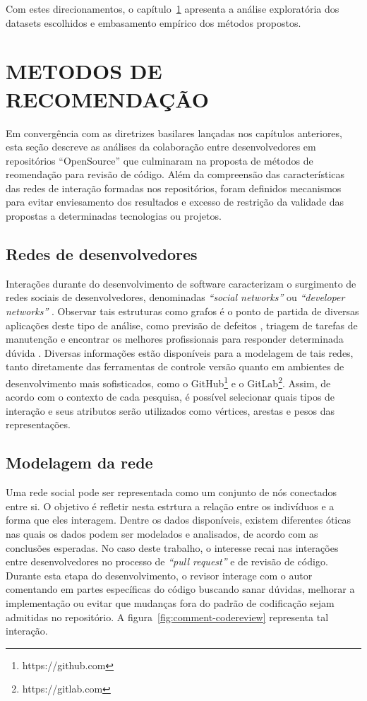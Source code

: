 \documentclass[12pt,openany,oneside,a4paper,english,brazil]{abntbibufjf}
\begin{document}
Com estes direcionamentos, o capítulo~\ref{chap:metodos} apresenta a análise exploratória dos datasets escolhidos e embasamento empírico dos métodos propostos.

\chapter{METODOS DE RECOMENDAÇÃO}\label{chap:metodos}

Em convergência com as diretrizes basilares lançadas nos capítulos anteriores, esta seção descreve as análises da colaboração entre desenvolvedores em repositórios ``OpenSource'' que culminaram na proposta de métodos de reomendação para revisão de código. Além da compreensão das características das redes de interação formadas nos repositórios, foram definidos mecanismos para evitar enviesamento dos resultados e excesso de restrição da validade das propostas a determinadas tecnologias ou projetos.

\section{Redes de desenvolvedores}

Interações durante do desenvolvimento de software caracterizam o surgimento de redes sociais de desenvolvedores, denominadas \textit{``social networks''} ou \textit{``developer networks''} \cite{lopez2004}. Observar tais estruturas como grafos é o ponto de partida de diversas aplicações deste tipo de análise, como previsão de defeitos \cite{meneely2008}, triagem de tarefas de manutenção \cite{zhang2012} e encontrar os melhores profissionais para responder determinada dúvida \cite{li2010}. Diversas informações estão disponíveis para a modelagem de tais redes, tanto diretamente das ferramentas de controle versão quanto em ambientes de desenvolvimento mais sofisticados, como o GitHub\footnote{https://github.com} e o GitLab\footnote{https://gitlab.com}. Assim, de acordo com o contexto de cada pesquisa, é possível selecionar quais tipos de interação e seus atributos serão utilizados como vértices, arestas e pesos das representações.

\section{Modelagem da rede}\label{sec:modelagem}
Uma rede social pode ser representada como um conjunto de nós conectados entre si. O objetivo é refletir nesta estrtura a relação entre os indivíduos e a forma que eles interagem. Dentre os dados disponíveis, existem diferentes óticas nas quais os dados podem ser modelados e analisados, de acordo com as conclusões esperadas. No caso deste trabalho, o interesse recai nas interações entre desenvolvedores no processo de \textit{``pull request''} e de revisão de código. Durante esta etapa do desenvolvimento, o revisor interage com o autor comentando em partes específicas do código buscando sanar dúvidas, melhorar a implementação ou evitar que mudanças fora do padrão de codificação sejam admitidas no repositório. A figura~\ref{fig:comment-codereview} representa tal interação.
\end{document}
